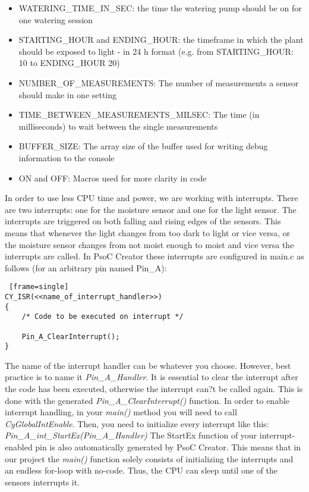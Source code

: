 \documentclass[11pt, oneside]{scrartcl}   	%
\begin{document}
\begin{itemize}
	\item WATERING\_TIME\_IN\_SEC: the time the watering pump should be on for one watering session
	\item STARTING\_HOUR and ENDING\_HOUR: the timeframe in which the plant should be exposed to light - in 24 h format (e.g. from STARTING\_HOUR: 10 to ENDING\_HOUR 20)
	\item NUMBER\_OF\_MEASUREMENTS: The number of measurements a sensor should make in one setting
	\item TIME\_BETWEEN\_MEASUREMENTS\_MILSEC: The time (in milliseconds) to wait between the single measurements
	\item BUFFER\_SIZE: The array size of the buffer used for writing debug information to the console
	\item ON and OFF: Macros used for more clarity in code
\end{itemize}

In order to use less CPU time and power, we are working with interrupts. There are two interrupts: one for the moisture sensor and one for the light sensor. The interrupts are triggered on both falling and rising edges of the sensors. This means that whenever the light changes from too dark to light or vice versa, or the moisture sensor changes from not moist enough to moist and vice versa the interrupts are called. In PsoC Creator these interrupts are configured in main.c as follows (for an arbitrary pin named Pin\_A):

\begin{lstlisting} [frame=single]
CY_ISR(<<name_of_interrupt_handler>>)
{
    /* Code to be executed on interrupt */
    
    Pin_A_ClearInterrupt();
}
\end{lstlisting}

The name of the interrupt handler can be whatever you choose. However, best practice is to name it \emph{Pin\_A\_Handler}. It is essential to clear the interrupt after the code has been executed, otherwise the interrupt can?t be called again. This is done with the generated \emph{Pin\_A\_ClearInterrupt()} function. In order to enable interrupt handling, in your \emph{main()} method you will need to call \emph{CyGlobalIntEnable}. Then, you need to initialize every interrupt like this: \emph{Pin\_A\_int\_StartEx(Pin\_A\_Handler)}
The StartEx function of your interrupt-enabled pin is also automatically generated by PsoC Creator. This means that in our project the \emph{main()} function solely consists of initializing the interrupts and an endless for-loop with no-code. Thus, the CPU can sleep until one of the sensors interrupts it. 
\end{document}

